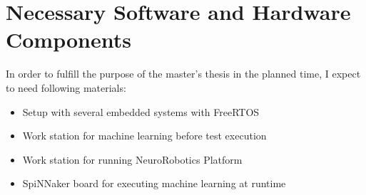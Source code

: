 \section*{Necessary Software and Hardware Components}\label{section:necessarycomponents}
In order to fulfill the purpose of the master’s thesis in the planned time, I expect to need following materials:

\begin{itemize}
	\item	Setup with several embedded systems with FreeRTOS
	\item	Work station for machine learning before test execution
	\item	Work station for running NeuroRobotics Platform
	\item	SpiNNaker board for executing machine learning at runtime
\end{itemize}
